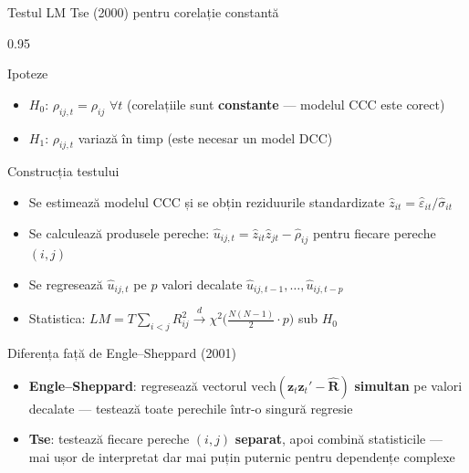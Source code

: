 \documentclass[9pt, aspectratio=169, t]{beamer}
\begin{document}
\begin{frame}{Testul LM Tse (2000) pentru corelație constantă}
    \begin{cminipage}{0.95\textwidth}
    \vspace{-3mm}
    {\scriptsize
    \begin{block}{Ipoteze}
        \begin{itemize}\setlength{\itemsep}{0pt}
            \item $H_0$: $\rho_{ij,t} = \rho_{ij}$ $\forall t$ (corelațiile sunt \textbf{constante} --- modelul CCC este corect)
            \item $H_1$: $\rho_{ij,t}$ variază în timp (este necesar un model DCC)
        \end{itemize}
    \end{block}
    \vspace{-1mm}
    \begin{block}{Construcția testului}
        \begin{itemize}\setlength{\itemsep}{0pt}
            \item Se estimează modelul CCC și se obțin reziduurile standardizate $\hat{z}_{it} = \hat{\varepsilon}_{it}/\hat{\sigma}_{it}$
            \item Se calculează produsele pereche: $\hat{u}_{ij,t} = \hat{z}_{it}\hat{z}_{jt} - \hat{\rho}_{ij}$ pentru fiecare pereche $(i,j)$
            \item Se regresează $\hat{u}_{ij,t}$ pe $p$ valori decalate $\hat{u}_{ij,t-1}, \ldots, \hat{u}_{ij,t-p}$
            \item Statistica: $LM = T \sum_{i<j} R^2_{ij} \xrightarrow{d} \chi^2\big(\frac{N(N-1)}{2} \cdot p\big)$ sub $H_0$
        \end{itemize}
    \end{block}
    \vspace{-1mm}
    \begin{alertblock}{Diferența față de Engle--Sheppard (2001)}
        \begin{itemize}\setlength{\itemsep}{0pt}
            \item \textbf{Engle--Sheppard}: regresează vectorul $\text{vech}(\mathbf{z}_t\mathbf{z}_t' - \hat{\mathbf{R}})$ \textbf{simultan} pe valori decalate --- testează toate perechile într-o singură regresie
            \item \textbf{Tse}: testează fiecare pereche $(i,j)$ \textbf{separat}, apoi combină statisticile --- mai ușor de interpretat dar mai puțin puternic pentru dependențe complexe
        \end{itemize}
    \end{alertblock}
    }
    \end{cminipage}
\end{frame}
\end{document}
